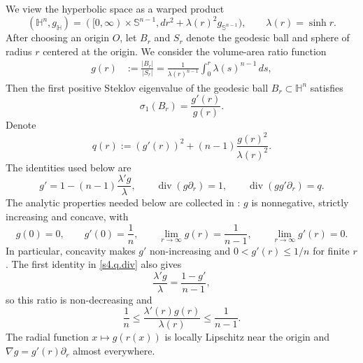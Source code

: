 \documentclass[11pt,reqno]{amsart}
\numberwithin{equation}{section}
\theoremstyle{definition}
\newcommand{\Sn}{\mathbb S}
\newcommand{\diver}{\operatorname{div}}
\newcommand{\HH}{\mathbb H}
\begin{document}
We view the hyperbolic space as a warped product
\begin{equation*}
    (\HH^n,g_{\HH})=([0,\infty)\times\Sn^{n-1},dr^2+\lambda(r)^2g_{\Sn^{n-1}}),
    \qquad
    \lambda(r)=\sinh r.
\end{equation*}
After choosing an origin $O$, let $B_r$ and $S_r$ denote the geodesic ball and sphere of radius $r$ centered at the origin. We consider the volume-area ratio function 
\begin{align*}
    g(r)&:=\frac{|B_r|}{|S_r|}=\frac{1}{\lambda(r)^{n-1}}\int_0^r\lambda(s)^{n-1}\,ds,
\end{align*}
Then the first positive Steklov eigenvalue of the geodesic ball $B_r\subset \mathbb{H}^n$ satisfies 
\begin{equation*}
    \sigma_1(B_r)=\frac{g'(r)}{g(r)}. 
\end{equation*}
Denote 
\begin{equation}\label{s4.q}
    q(r):=(g'(r))^2+(n-1)\frac{g(r)^2}{\lambda(r)^2}.
\end{equation}
The identities used below are
\begin{equation}\label{s4.q.div}
    g'=1-(n-1)\frac{\lambda'g}{\lambda},
    \qquad
    \diver(g\partial_r)=1,
    \qquad
    \diver(gg'\partial_r)=q.
\end{equation}
The analytic properties needed below are collected in
\cite[Propositions~3.4 and~3.5]{GuLiWan2025}: $g$ is nonnegative,
strictly increasing and concave, with
\begin{equation*}
    g(0)=0,
    \qquad g'(0)=\frac1n,
    \qquad \lim_{r\to\infty}g(r)=\frac1{n-1},
    \qquad \lim_{r\to\infty}g'(r)=0.
\end{equation*}
In particular, concavity makes $g'$ non-increasing and
$0<g'(r)\leq1/n$ for finite $r$.  The first identity in
\eqref{s4.q.div} also gives
\begin{equation*}
    \frac{\lambda'g}{\lambda}=\frac{1-g'}{n-1},
\end{equation*}
so this ratio is non-decreasing and
\begin{equation}\label{eq:hyp-a-range}
    \frac1n\leq \frac{\lambda'(r)g(r)}{\lambda(r)} \leq\frac1{n-1}.
\end{equation}
The radial function $x\mapsto g(r(x))$ is locally Lipschitz near the origin and $ \nabla g=g'(r)\partial_r$ 
almost everywhere.
\end{document}
